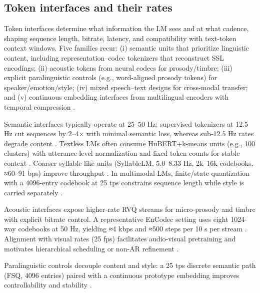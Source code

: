 \subsection{Token interfaces and their rates} \label{subsec:Token interfaces and their rates}
Token interfaces determine what information the LM sees and at what cadence, shaping sequence length, bitrate, latency, and compatibility with text-token context windows. Five families recur: (i) semantic units that prioritize linguistic content, including representation–codec tokenizers that reconstruct SSL encodings; (ii) acoustic tokens from neural codecs for prosody/timbre; (iii) explicit paralinguistic controls (e.g., word-aligned prosody tokens) for speaker/emotion/style; (iv) mixed speech–text designs for cross-modal transfer; and (v) continuous embedding interfaces from multilingual encoders with temporal compression \cite{qian2025prosodylmuncoveringemergingprosodyproces,fily2024establishingdegreesclosenessbetweenaudio,entry2025towardjointlanguagemodelingspeechunitste,huang2024repcodecspeechrepresentationcodectokeniz}.

Semantic interfaces typically operate at 25–50 Hz; supervised tokenizers at 12.5 Hz cut sequences by 2–4× with minimal semantic loss, whereas sub-12.5 Hz rates degrade content \cite{zeng2024scalingspeechtextpretrainingsyntheticint}. Textless LMs often consume HuBERT+k-means units (e.g., 100 clusters) with utterance-level normalization and fixed token counts for stable context \cite{hsu2024exploringcontextlearningtextlessspeechla}. Coarser syllable-like units (SyllableLM, 5.0–8.33 Hz, 2k–16k codebooks, ≈60–91 bps) improve throughput \cite{baade2024syllablelmlearningcoarsesemanticunitsspe}. In multimodal LMs, finite/state quantization with a 4096-entry codebook at 25 tps constrains sequence length while style is carried separately \cite{chen2025emovaempoweringlanguagemodelsseehearspea}.

Acoustic interfaces expose higher-rate RVQ streams for micro‑prosody and timbre with explicit bitrate control. A representative EnCodec setting uses eight 1024-way codebooks at 50 Hz, yielding ≈4 kbps and ≈500 steps per 10 s per stream \cite{peng2024mslms2stmultitaskspeechlanguagemodeltext}. Alignment with visual rates (25 fps) facilitates audio-visual pretraining and motivates hierarchical scheduling or non-AR refinement \cite{sadok2025vectorquantizedmaskedautoencoderaudiovis,peng2024mslms2stmultitaskspeechlanguagemodeltext}.

Paralinguistic controls decouple content and style: a 25 tps discrete semantic path (FSQ, 4096 entries) paired with a continuous prototype embedding improves controllability and stability \cite{chen2025emovaempoweringlanguagemodelsseehearspea}.

